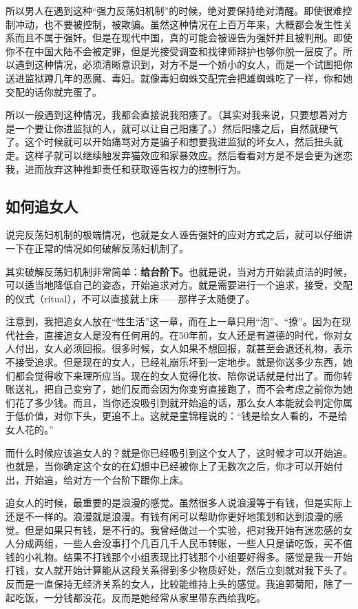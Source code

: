 所以男人在遇到这种``强力反荡妇机制''的时候，绝对要保持绝对清醒。即使很难控制冲动，也不要被控制，被欺骗。虽然这种情况在上百万年来，大概都会发生性关系而且不属于强奸。但是在现代中国，真的可能会被诬告为强奸并且被判刑。即使你不在中国大陆不会被定罪，但是光接受调查和找律师辩护也够你脱一层皮了。所以遇到这种情况，必须清晰意识到，对方不是一个娇小的女人，而是一个试图把你送进监狱蹲几年的恶魔、毒妇。就像毒妇蜘蛛交配完会把雄蜘蛛吃了一样，你和她交配的话你就完蛋了。

所以一般遇到这种情况，我都会直接说我阳痿了。（其实对我来说，只要想着对方是一个要让你进监狱的人，就可以让自己阳痿了。）然后阳痿之后，自然就硬气了。这个时候就可以开始痛骂对方是骗子和想要我进监狱的坏女人，然后扭头就走。这样子就可以继续触发弃猫效应和家暴效应。然后看看对方是不是会更为迷恋我，进而放弃这种推卸责任和获取诬告权力的控制行为。

\subsection{如何追女人}

说完反荡妇机制的极端情况，也就是女人诬告强奸的应对方式之后，就可以仔细讲一下在正常的情况如何破解反荡妇机制了。

其实破解反荡妇机制非常简单：\textbf{给台阶下。}也就是说，当对方开始装贞洁的时候，可以适当地降低自己的姿态，开始追求对方。就是需要进行一个追求，接受，交配的仪式（ritual），不可以直接就上床——那样子太随便了。

注意到，我把追女人放在``性生活''这一章，而在上一章只用``泡''、``撩''。因为在现代社会，直接追女人是没有任何用的。在50年前，女人还是有道德的时代，你对女人付出，女人必须回报。很多时候，女人如果不想回报，就甚至会退还礼物，表示不接受追求。但是现在的女人，已经礼崩乐坏到一定地步。就是你送多少东西，她们都会觉得收下来理所应当。现在的女人觉得化妆、陪你说话就是付出了。而你转账送礼，把自己变穷了，她们反而会因为你变穷直接跑了，而不会考虑之前你为她们花了多少钱。而且，当你还没吸引到就开始追的话，那么女人本能就会判定你属于低价值，对你下头，更追不上。这就是童锦程说的：``钱是给女人看的，不是给女人花的。''

而什么时候应该追女人的？就是你已经吸引到这个女人了，这时候才可以开始追。也就是，当你确定这个女的在幻想中已经被你上了无数次之后，你才可以开始付出，开始追，给对方一个台阶下跟你上床。

追女人的时候，最重要的是浪漫的感觉。虽然很多人说浪漫等于有钱，但是实际上还是不一样的。浪漫就是浪漫。有钱有闲可以帮助你更好地策划和达到浪漫的感觉。但是如果只有钱，是不行的。我曾经做过一个实验，把对我开始有迷恋感的女人分成两组，一些人会没事打个几百几千人民币转账，一些人只是请吃饭，买不值钱的小礼物。结果不打钱那个小组表现比打钱那个小组要好得多。感觉是我一开始打钱，女人就开始计算能从这段关系得到多少物质好处，然后立刻就对我下头了。反而是一直保持无经济关系的女人，比较能维持上头的感觉。我追郭菊阳，除了一起吃饭，一分钱都没花。反而是她经常从家里带东西给我吃。

